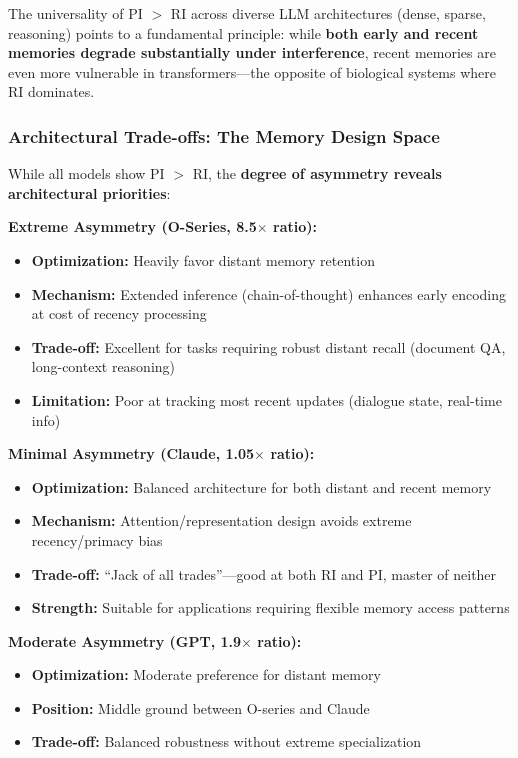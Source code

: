 \documentclass{article}
\begin{document}
The universality of PI $>$ RI across diverse LLM architectures (dense, sparse, reasoning) points to a fundamental principle: while \textbf{both early and recent memories degrade substantially under interference}, recent memories are even more vulnerable in transformers---the opposite of biological systems where RI dominates.

\subsubsection{Architectural Trade-offs: The Memory Design Space}

While all models show PI $>$ RI, the \textbf{degree of asymmetry reveals architectural priorities}:

\textbf{Extreme Asymmetry (O-Series, 8.5$\times$ ratio):}
\begin{itemize}[itemsep=1pt,topsep=2pt,parsep=0pt]
    \item \textbf{Optimization:} Heavily favor distant memory retention
    \item \textbf{Mechanism:} Extended inference (chain-of-thought) enhances early encoding at cost of recency processing
    \item \textbf{Trade-off:} Excellent for tasks requiring robust distant recall (document QA, long-context reasoning)
    \item \textbf{Limitation:} Poor at tracking most recent updates (dialogue state, real-time info)
\end{itemize}

\textbf{Minimal Asymmetry (Claude, 1.05$\times$ ratio):}
\begin{itemize}[itemsep=1pt,topsep=2pt,parsep=0pt]
    \item \textbf{Optimization:} Balanced architecture for both distant and recent memory
    \item \textbf{Mechanism:} Attention/representation design avoids extreme recency/primacy bias
    \item \textbf{Trade-off:} ``Jack of all trades''---good at both RI and PI, master of neither
    \item \textbf{Strength:} Suitable for applications requiring flexible memory access patterns
\end{itemize}

\textbf{Moderate Asymmetry (GPT, 1.9$\times$ ratio):}
\begin{itemize}[itemsep=1pt,topsep=2pt,parsep=0pt]
    \item \textbf{Optimization:} Moderate preference for distant memory
    \item \textbf{Position:} Middle ground between O-series and Claude
    \item \textbf{Trade-off:} Balanced robustness without extreme specialization
\end{itemize}
\end{document}
